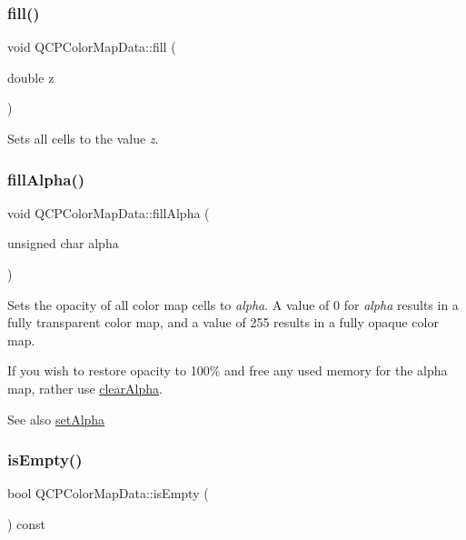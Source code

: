 \subsubsection{\texorpdfstring{fill()}{fill()}}
{\footnotesize\ttfamily void Q\+C\+P\+Color\+Map\+Data\+::fill (\begin{DoxyParamCaption}\item[{double}]{z }\end{DoxyParamCaption})}

Sets all cells to the value {\itshape z}. \mbox{\label{classQCPColorMapData_a93e2a549d7702bc849cd48a585294657}} 
\subsubsection{\texorpdfstring{fill\+Alpha()}{fillAlpha()}}
{\footnotesize\ttfamily void Q\+C\+P\+Color\+Map\+Data\+::fill\+Alpha (\begin{DoxyParamCaption}\item[{unsigned char}]{alpha }\end{DoxyParamCaption})}

Sets the opacity of all color map cells to {\itshape alpha}. A value of 0 for {\itshape alpha} results in a fully transparent color map, and a value of 255 results in a fully opaque color map.

If you wish to restore opacity to 100\% and free any used memory for the alpha map, rather use \hyperlink{classQCPColorMapData_a14d08b9c3720cd719400079b86d3906b}{clear\+Alpha}.

\begin{DoxySeeAlso}{See also}
\hyperlink{classQCPColorMapData_aaf7de5b34c58f38d8f4c1ceb064a876c}{set\+Alpha} 
\end{DoxySeeAlso}
\mbox{\label{classQCPColorMapData_aea88cc75a76ca571acf29b2ba8ac970d}} 
\subsubsection{\texorpdfstring{is\+Empty()}{isEmpty()}}
{\footnotesize\ttfamily bool Q\+C\+P\+Color\+Map\+Data\+::is\+Empty (\begin{DoxyParamCaption}{ }\end{DoxyParamCaption}) const\hspace{0.3cm}{\ttfamily [inline]}}

